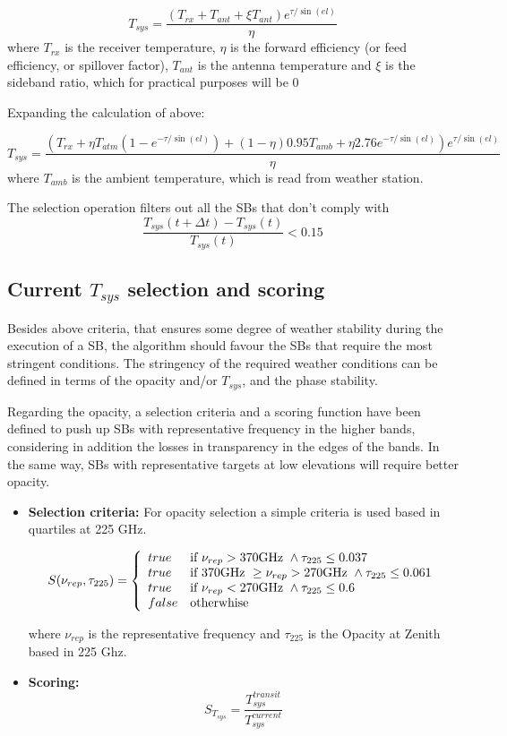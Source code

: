 \documentclass{article}
\begin{document}
\begin{enumerate}
$$
T_{sys} = \frac {\left ( T_{rx} + T_{ant} + \xi T_{ant} \right ) e^{\tau / \sin(el)}}
{\eta}
$$
where $T_{rx}$ is the receiver temperature, $\eta$ is the forward efficiency (or
feed efficiency, or spillover factor), $T_{ant}$ is the antenna temperature and $\xi$
is the sideband ratio, which for practical purposes will be $0$

Expanding the calculation of above:

$$
T_{sys} = \frac{\left ( T_{rx} + \eta T_{atm} \left ( 1 - e^{-\tau/\sin(el)} \right ) + (1 - \eta) 0.95 T_{amb} + \eta 2.76 e^{-\tau/\sin(el)} \right )  e^{\tau / \sin(el)}}
{\eta}
$$
where $T_{amb}$ is the ambient temperature, which is read from weather station.

\end{enumerate}

The selection operation filters out all the SBs that don't comply with
$$
\frac{T_{sys}(t+\Delta t) - T_{sys}(t)}{T_{sys}(t)} < 0.15
$$

\subsection{Current $T_{sys}$ selection and scoring}

Besides above criteria, that ensures some degree of weather stability during the execution
of a SB, the algorithm should
favour the SBs that require the most stringent conditions. The stringency of the
required weather conditions can be defined in terms of the opacity and/or $T_{sys}$,
and the phase stability.

Regarding the opacity, a selection criteria and a scoring function have been defined to push up SBs with
representative frequency in the higher bands, considering in addition the losses in transparency
in the edges of the bands. In the same way, SBs with representative targets
at low elevations will require better opacity.

\begin{itemize}
\item \textbf{Selection criteria:} For opacity selection a simple criteria is used based in
quartiles at 225 GHz.

$$
S(\nu_{rep}, \tau_{225}) = \left\{
    \begin{array}{l l}
    true & \text{if } \nu_{rep} > 370 \text{GHz } \land \tau_{225} \leq 0.037 \\
    true & \text{if } 370 \text{GHz } \geq \nu_{rep} > 270 \text{GHz } \land \tau_{225} \leq 0.061 \\
    true & \text{if } \nu_{rep} < 270 \text{GHz } \land \tau_{225} \leq 0.6\\
    false & \text{otherwhise}
    \end{array} \right . 
$$

where $\nu_{rep}$ is the representative frequency and $\tau_{225}$ is the Opacity
at Zenith based in 225 Ghz.

\item \textbf{Scoring:} 
$$
	S_{T_{sys}} = \frac{T_{sys}^{transit}}{T_{sys}^{current}}
$$
\end{itemize}
\end{document}
